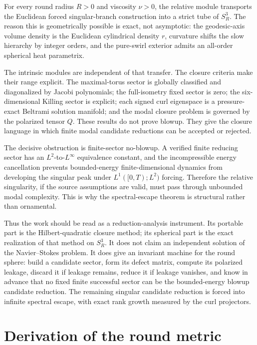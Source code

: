 \documentclass[aps,prd,reprint,superscriptaddress,nofootinbib,floatfix]{revtex4-2}
\theoremstyle{definition}
\theoremstyle{remark}
\begin{document}
For every round radius \(R>0\) and viscosity \(\nu>0\), the relative module transports the Euclidean forced singular-branch construction into a strict tube of \(S^3_R\).  The reason this is geometrically possible is exact, not asymptotic: the geodesic-axis volume density is the Euclidean cylindrical density \(r\), curvature shifts the slow hierarchy by integer orders, and the pure-swirl exterior admits an all-order spherical heat parametrix.

The intrinsic modules are independent of that transfer.  The closure criteria make their range explicit.  The maximal-torus sector is globally classified and diagonalized by Jacobi polynomials; the full-isometry fixed sector is zero; the six-dimensional Killing sector is explicit; each signed curl eigenspace is a pressure-exact Beltrami solution manifold; and the modal closure problem is governed by the polarized tensor \(Q\).  These results do not prove blowup.  They give the closure language in which finite modal candidate reductions can be accepted or rejected.

The decisive obstruction is finite-sector no-blowup.  A verified finite reducing sector has an \(L^2\)-to-\(L^\infty\) equivalence constant, and the incompressible energy cancellation prevents bounded-energy finite-dimensional dynamics from developing the singular peak under \(L^1([0,T);L^2)\) forcing.  Therefore the relative singularity, if the source assumptions are valid, must pass through unbounded modal complexity.  This is why the spectral-escape theorem is structural rather than ornamental.

Thus the work should be read as a reduction-analysis instrument.  Its portable part is the Hilbert-quadratic closure method; its spherical part is the exact realization of that method on \(S^3_R\).  It does not claim an independent solution of the Navier--Stokes problem.  It does give an invariant machine for the round sphere: build a candidate sector, form its defect matrix, compute its polarized leakage, discard it if leakage remains, reduce it if leakage vanishes, and know in advance that no fixed finite successful sector can be the bounded-energy blowup candidate reduction.  The remaining singular candidate reduction is forced into infinite spectral escape, with exact rank growth measured by the curl projectors.

\appendix

\section{Derivation of the round metric}\label{app:metric}
\end{document}
